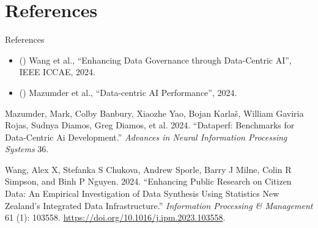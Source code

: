 \documentclass[
  12pt,
  ignorenonframetext,
]{beamer}
\providecommand{\tightlist}{%
  \setlength{\itemsep}{0pt}\setlength{\parskip}{0pt}}\usepackage{longtable,booktabs,array}
\newlength{\cslhangindent}
\newenvironment{CSLReferences}[2] %
 {\begin{list}{}{%
  \setlength{\itemindent}{0pt}
  \setlength{\leftmargin}{0pt}
  \setlength{\parsep}{0pt}
  \ifodd #1
   \setlength{\leftmargin}{\cslhangindent}
   \setlength{\itemindent}{-1\cslhangindent}
  \fi
  \setlength{\itemsep}{#2\baselineskip}}}
 {\end{list}}
\begin{document}
\section{References}\label{references}

\begin{frame}{References}
\begin{itemize}
\tightlist
\item
  () Wang et al.,
  ``Enhancing Data Governance through Data-Centric AI'', IEEE ICCAE,
  2024.
\item
  () Mazumder
  et al., ``Data-centric AI Performance'', 2024.
\end{itemize}

\label{refs}
\begin{CSLReferences}{1}{0}
Mazumder, Mark, Colby Banbury, Xiaozhe Yao, Bojan Karlaš, William
Gaviria Rojas, Sudnya Diamos, Greg Diamos, et al. 2024. {``Dataperf:
Benchmarks for Data-Centric Ai Development.''} \emph{Advances in Neural
Information Processing Systems} 36.

Wang, Alex X, Stefanka S Chukova, Andrew Sporle, Barry J Milne, Colin R
Simpson, and Binh P Nguyen. 2024. {``Enhancing Public Research on
Citizen Data: An Empirical Investigation of Data Synthesis Using
{Statistics New Zealand}'s Integrated Data Infrastructure.''}
\emph{Information Processing \& Management} 61 (1): 103558.
\url{https://doi.org/10.1016/j.ipm.2023.103558}.

\end{CSLReferences}
\end{frame}
\end{document}
